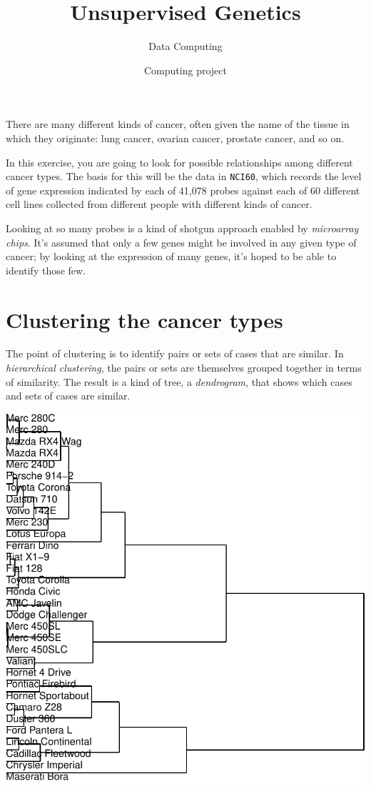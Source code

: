 \documentclass[]{tufte-handout}
\title{Unsupervised Genetics}
\author{Data Computing}
\date{Computing project}
\begin{document}
\maketitle




There are many different kinds of cancer, often given the name of the
tissue in which they originate: lung cancer, ovarian cancer, prostate
cancer, and so on.

In this exercise, you are going to look for possible relationships among
different cancer types. The basis for this will be the data in
\texttt{NCI60}, which records the level of gene expression indicated by
each of 41,078 probes against each of 60 different cell lines collected
from different people with different kinds of cancer.

Looking at so many probes is a kind of shotgun approach enabled by
\emph{microarray chips}. It's assumed that only a few genes might be
involved in any given type of cancer; by looking at the expression of
many genes, it's hoped to be able to identify those few.

\section{Clustering the cancer types}\label{clustering-the-cancer-types}

The point of clustering is to identify pairs or sets of cases that are
similar. In \emph{hierarchical clustering}, the pairs or sets are
themselves grouped together in terms of similarity. The result is a kind
of tree, a \emph{dendrogram}, that shows which cases and sets of cases
are similar.

\begin{marginfigure}
\includegraphics{863-UnsupervisedGenetics_files/figure-latex/unnamed-chunk-2-1} \end{marginfigure}
\end{document}
